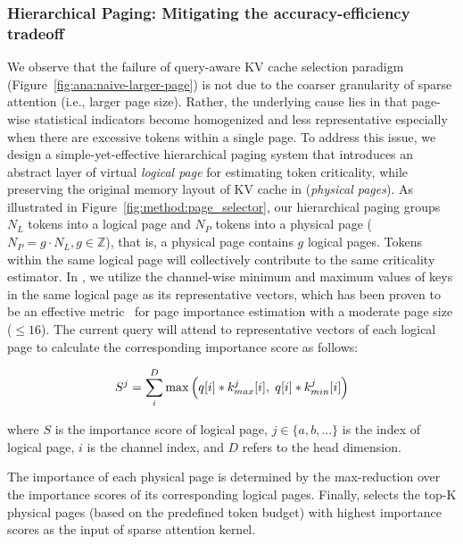 


\subsubsection{Hierarchical Paging: Mitigating the accuracy-efficiency tradeoff} 
\label{sect:method:decoding:hierarchical_page}


We observe that the failure of query-aware KV cache selection paradigm (Figure~\ref{fig:ana:naive-larger-page}) is not due to the coarser granularity of sparse attention (i.e., larger page size). Rather, the underlying cause lies in that page-wise statistical indicators become homogenized and less representative especially when there are excessive tokens within a single page.
To address this issue, we design a simple-yet-effective hierarchical paging system that introduces an abstract layer of virtual \textit{logical page} for estimating token criticality, while preserving the original memory layout of KV cache in (\textit{physical pages}).
As illustrated in Figure~\ref{fig:method:page_selector}, our hierarchical paging groups $N_L$ tokens into a logical page and $N_P$ tokens into a physical page ($N_P = g\cdot N_L, g\in \mathbb{Z}$), that is, a physical page contains $g$ logical pages. 
Tokens within the same logical page will collectively contribute to the same criticality estimator. In \system, we utilize the channel-wise minimum and maximum values of keys in the same logical page as its representative vectors, which has been proven to be an effective metric~\cite{tang2024quest} for page importance estimation with a moderate page size ($\leq 16$).
The current query will attend to representative vectors of each logical page to calculate the corresponding importance score as follows:

\vspace{-14pt}
\begin{equation}
\small
S^{j} = \sum_i^D \max{\left(q[i]*k^j_{max}[i], \hspace{3pt} q[i]*k^j_{min}[i] \right)}
\label{eqn:method:estimator}
\end{equation}
\vspace{-14pt}

where $S$ is the importance score of logical page, $j\in\{a,b,...\}$ is the index of logical page, $i$ is the channel index, and $D$ refers to the head dimension.

The importance of each physical page is determined by the max-reduction over the importance scores of its corresponding logical pages. Finally, \system selects the top-K physical pages (based on the predefined token budget) with highest importance scores as the input of sparse attention kernel.




